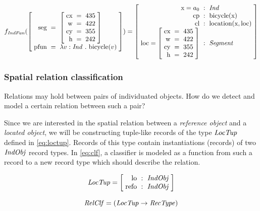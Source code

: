 \begin{equation}\label{eq:indfunrec}
f_\type{IndFun}(
\rec{
\text{seg} &=& \rec{
\text{cx} &=& 435\\
\text{w} &=& 422\\
\text{cy} &=& 355\\
\text{h} &=& 242
}\\
\text{pfun} &=& \lambda v:\type{Ind}\ .\ \text{bicycle}(v)\\
}
) =
\rec{
    \text{x} = a_0 &:& \type{Ind} \\
    \text{cp} &:& \text{bicycle}(\text{x}) \\
    \text{cl} &:& \text{location}(\text{x}, \text{loc}) \\
    \text{loc} = \rec{
        \text{cx} &=& 435\\
        \text{w} &=& 422\\
        \text{cy} &=& 355\\
        \text{h} &=& 242
		} &:& \type{Segment}\\
}
\end{equation}



\subsubsection{Spatial relation classification}

Relations may hold between pairs of individuated objects.
How do we detect and model a certain relation between such a pair?

Since we are interested in the spatial relation between a \textit{reference object} and a \textit{located object}, we will be constructing tuple-like records of the type $\mathit{LocTup}$ defined in \autoref{eq:loctup}.
Records of this type contain instantiations (records) of two $\mathit{IndObj}$ record types.
In \autoref{eq:clf}, a classifier is modeled as a function from such a record to a new record type which should describe the relation.

\begin{equation}\label{eq:loctup}
\type{LocTup} = \rec{
    \text{lo} &:& \type{IndObj} \\
    \text{refo} &:& \type{IndObj} \\
    }
\end{equation}

\begin{equation}\label{eq:clf}
\mathit{RelClf} = ( \mathit{LocTup} \rightarrow \mathit{RecType} )
\end{equation}

